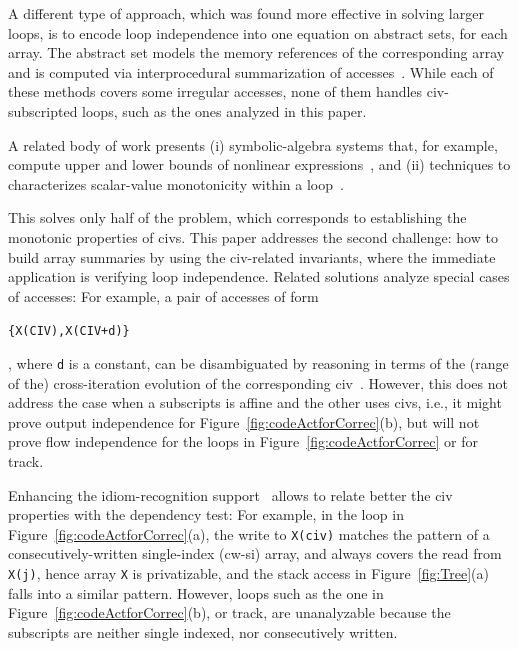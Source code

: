 \documentclass{sig-alternate}
\begin{document}
A different type of approach, which was found more effective in
solving larger loops, is to encode loop independence into one equation 
on abstract sets, for each array. The abstract set models the
memory references of the corresponding array and is computed 
via interprocedural summarization of 
accesses~\cite{SUIF,Moon99PredArrDataFlow,SummaryMonot,LMAD}.
While each of these methods covers some irregular accesses,
none of them handles {\sc civ}-subscripted loops,   
such as the ones analyzed in this paper.
%

A related  body of work presents (i) symbolic-algebra systems that, for example,  
compute upper and lower bounds of nonlinear expressions~\cite{Fahringer97EffSymb},
and (ii) techniques to characterizes scalar-value monotonicity within a 
loop~\cite{VEG,MonStmt}.

This solves only half of the problem, which   
corresponds to establishing the monotonic properties of {\sc civ}s.
This paper addresses the second challenge: 
how to build array summaries by using the {\sc civ}-related invariants,
where the immediate application is verifying loop independence. 
Related solutions analyze special cases of accesses:
%
For example, a pair of accesses of form  
\begin{small}{\tt\{X(CIV),X(CIV+d)\}}\end{small}, where {\tt d} is a constant,
can be disambiguated by reasoning in terms of the
(range of the) cross-iteration evolution of the corresponding {\sc civ}~\cite{CohenBeyondMon}.
%
However, this does not address the case when a subscripts is affine
and the other uses {\sc civ}s, i.e., it might prove output 
independence for Figure~\ref{fig:codeActforCorrec}(b),
but will not prove flow independence for the loops in 
Figure~\ref{fig:codeActforCorrec} %
or for {\sc track}. %

Enhancing the idiom-recognition support~\cite{PaduaStackArr,PaduaDemDrInterproc} 
allows to relate better the {\sc civ} properties with the dependency test: 
For example, in the loop in Figure~\ref{fig:codeActforCorrec}(a), the write to 
{\tt X(civ)} matches the pattern of a consecutively-written single-index ({\sc cw-si}) 
array, and always covers the read from {\tt X(j)}, hence array {\tt X} is privatizable,
and the stack access in Figure~\ref{fig:Tree}(a) falls into a similar pattern.
%
%
However, loops such as the one in Figure~\ref{fig:codeActforCorrec}(b),
or {\sc track}, are unanalyzable because 
the subscripts are neither single indexed, nor consecutively written.  
\end{document}
